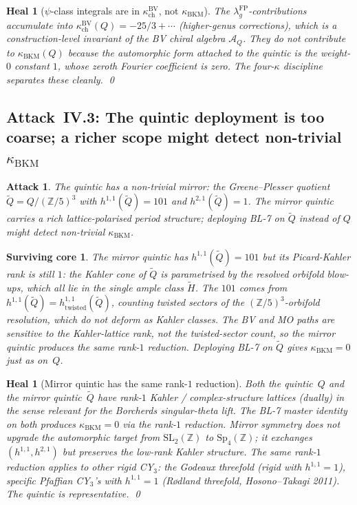 \documentclass[11pt]{amsart}
\newtheorem{attack}[theorem]{Attack}
\newtheorem{surviving}[theorem]{Surviving core}
\newtheorem{heal}[theorem]{Heal}
\providecommand{\Z}{\mathbb{Z}}
\providecommand{\cA}{\mathcal{A}}
\providecommand{\Sp}{\mathrm{Sp}}
\providecommand{\SL}{\mathrm{SL}}
\providecommand{\BV}{\mathrm{BV}}
\providecommand{\kBKM}{\kappa_{\mathrm{BKM}}}
\providecommand{\kch}{\kappa_{\mathrm{ch}}}
\begin{document}
\begin{heal}[$\psi$-class integrals are in $\kch^{\BV}$, not $\kBKM$]
\label{heal:psi-class-in-kch-bv}
The $\lambda_g^{\mathrm{FP}}$-contributions accumulate into
$\kch^{\BV}(Q) = -25/3 + \cdots$ (higher-genus corrections), which
is a construction-level invariant of the BV chiral algebra $\cA_Q$.
They do not contribute to $\kBKM(Q)$ because the automorphic form
attached to the quintic is the weight-$0$ constant $1$, whose zeroth
Fourier coefficient is zero. The four-$\kappa$ discipline separates
these cleanly.
\qed
\end{heal}

\subsection{Attack~IV.3: The quintic deployment is too coarse;
a richer scope might detect non-trivial $\kBKM$}

\begin{attack}
\label{att:richer-scope-quintic}
The quintic has a non-trivial mirror: the Greene--Plesser quotient
$\tilde Q = Q / (\Z/5)^3$ with $h^{1,1}(\tilde Q) = 101$ and
$h^{2,1}(\tilde Q) = 1$. The mirror quintic carries a rich
lattice-polarised period structure; deploying BL-7 on $\tilde Q$
instead of $Q$ might detect non-trivial $\kBKM$.
\end{attack}

\begin{surviving}
\label{surv:mirror-does-not-help}
The mirror quintic has $h^{1,1}(\tilde Q) = 101$ but its
\emph{Picard-Kahler} rank is still $1$: the Kahler cone of $\tilde Q$
is parametrised by the resolved orbifold blow-ups, which all lie
in the single ample class $\tilde H$. The $101$ comes from
$h^{1,1}(\tilde Q) = h^{1,1}_{\mathrm{twisted}}(\tilde Q)$, counting
twisted sectors of the $(\Z/5)^3$-orbifold resolution, which do
not deform as Kahler classes. The BV and MO paths are sensitive to
the Kahler-lattice rank, not the twisted-sector count, so the
mirror quintic produces the same rank-$1$ reduction. Deploying BL-7
on $\tilde Q$ gives $\kBKM = 0$ just as on~$Q$.
\end{surviving}

\begin{heal}[Mirror quintic has the same rank-$1$ reduction]
\label{heal:mirror-same-reduction}
Both the quintic~$Q$ and the mirror quintic~$\tilde Q$ have
rank-$1$ Kahler / complex-structure lattices (dually) in the sense
relevant for the Borcherds singular-theta lift. The BL-7 master
identity on both produces $\kBKM = 0$ via the rank-$1$ reduction.
Mirror symmetry does \emph{not} upgrade the automorphic target
from $\SL_2(\Z)$ to $\Sp_4(\Z)$; it exchanges $(h^{1,1}, h^{2,1})$
but preserves the low-rank Kahler structure.
The same rank-$1$ reduction applies to other rigid CY$_3$: the
Godeaux threefold (rigid with $h^{1,1} = 1$), specific
Pfaffian CY$_3$'s with $h^{1,1} = 1$ (R{\o}dland threefold,
Hosono--Takagi 2011). The quintic is representative.
\qed
\end{heal}
\end{document}
